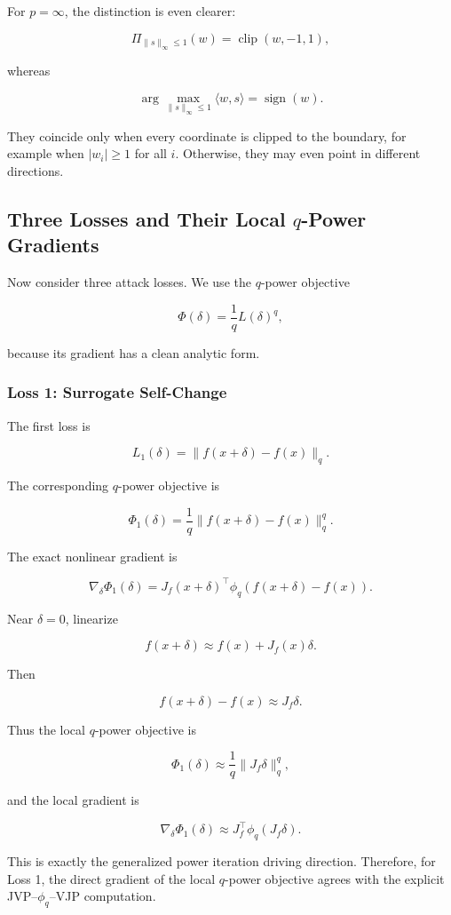 \documentclass{article}
\begin{document}
For \(p=\infty\), the distinction is even clearer:

\[
\Pi_{\|s\|_\infty\le1}(w)
=
\operatorname{clip}(w,-1,1),
\]

whereas

\[
\arg\max_{\|s\|_\infty\le1}\langle w,s\rangle
=
\operatorname{sign}(w).
\]

They coincide only when every coordinate is clipped to the boundary, for example when \(|w_i|\ge1\) for all \(i\). Otherwise, they may even point in different directions.

\subsection{Three Losses and Their Local \(q\)-Power Gradients}

Now consider three attack losses. We use the \(q\)-power objective

\[
\Phi(\delta)=\frac{1}{q}L(\delta)^q,
\]

because its gradient has a clean analytic form.

\subsubsection{Loss 1: Surrogate Self-Change}

The first loss is

\[
L_1(\delta)
=
\|f(x+\delta)-f(x)\|_q.
\]

The corresponding \(q\)-power objective is

\[
\Phi_1(\delta)
=
\frac{1}{q}
\|f(x+\delta)-f(x)\|_q^q.
\]

The exact nonlinear gradient is

\[
\nabla_\delta \Phi_1(\delta)
=
J_f(x+\delta)^\top
\phi_q
\left(
f(x+\delta)-f(x)
\right).
\]

Near \(\delta=0\), linearize

\[
f(x+\delta)
\approx
f(x)+J_f(x)\delta.
\]

Then

\[
f(x+\delta)-f(x)
\approx
J_f\delta.
\]

Thus the local \(q\)-power objective is

\[
\Phi_1(\delta)
\approx
\frac{1}{q}\|J_f\delta\|_q^q,
\]

and the local gradient is

\[
\nabla_\delta \Phi_1(\delta)
\approx
J_f^\top\phi_q(J_f\delta).
\]

This is exactly the generalized power iteration driving direction. Therefore, for Loss 1, the direct gradient of the local \(q\)-power objective agrees with the explicit JVP--\(\phi_q\)--VJP computation.
\end{document}
